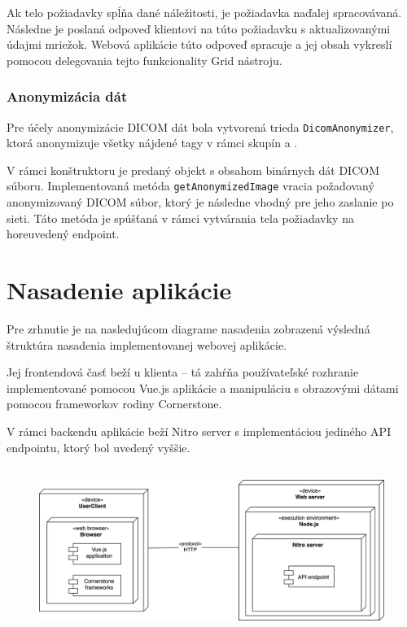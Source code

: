 Ak telo požiadavky spĺňa dané náležitosti, je požiadavka naďalej spracovávaná. Následne je poslaná odpoveď klientovi na túto požiadavku s aktualizovanými údajmi mriežok. Webová aplikácie túto odpoveď spracuje a jej obsah vykreslí pomocou delegovania tejto funkcionality Grid nástroju.

\subsubsection {Anonymizácia dát}
Pre účely anonymizácie DICOM dát bola vytvorená trieda \texttt{DicomAnonymizer}, ktorá anonymizuje všetky nájdené tagy v rámci skupín  a .

\clearpage

V rámci konštruktoru je predaný objekt s obsahom binárnych dát DICOM súboru. Implementovaná metóda \texttt{getAnonymizedImage} vracia požadovaný anonymizovaný DICOM súbor, ktorý je následne vhodný pre jeho zaslanie po sieti. Táto metóda je spúšťaná v rámci vytvárania tela požiadavky na horeuvedený endpoint.

\section {Nasadenie aplikácie}
Pre zrhnutie je na nasledujúcom diagrame nasadenia zobrazená výsledná štruktúra nasadenia implementovanej webovej aplikácie.

Jej frontendová časť beží u klienta -- tá zahŕňa používateľské rozhranie implementované pomocou Vue.js aplikácie a manipuláciu s obrazovými dátami pomocou frameworkov rodiny Cornerstone.

V rámci backendu aplikácie beží Nitro server s implementáciou jediného API endpointu, ktorý bol uvedený vyššie.

\begin {figure}[H]
        \centering
        \includegraphics[height=5.4cm]{media/graphs/deployment_diagram.png}
        \captionsetup{justification=centering}
\end {figure}

